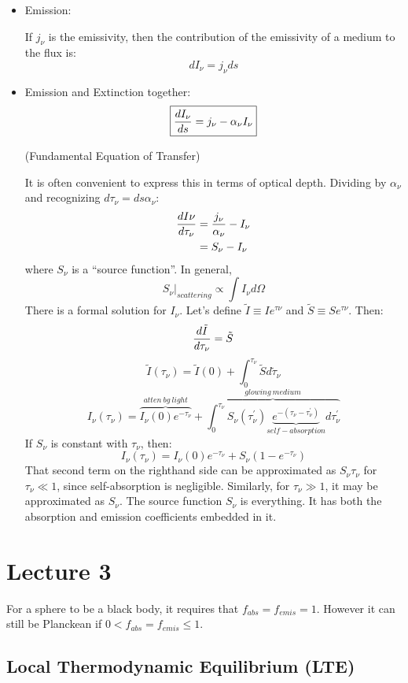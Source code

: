 \documentclass[11pt]{article}
\def\eval#1{\big|_{#1}}
\begin{document}
\begin{itemize}
\item Emission:\par
If $j_\nu $ is the emissivity, then the contribution of the emissivity of
a medium to the flux is:
$$dI_\nu=j_\nu ds$$
\item Emission and Extinction together:
$$\boxed{{dI_\nu\over ds}=j_\nu-\alpha_\nu I_\nu}$$
\centerline{(Fundamental Equation of Transfer)}\par
It is often convenient to express this in terms of optical depth.  
Dividing by $\alpha_\nu$ and recognizing $d\tau_\nu = ds \alpha_\nu$:
$$\begin{aligned}{dI\nu\over d\tau_\nu}&={j_\nu\over\alpha_\nu}-I_\nu\\ 
&=S_\nu-I_\nu\\
\end{aligned}$$
where $S_\nu$ is a ``source function''. In general,
$$S_\nu\eval{scattering}\propto\int{I_\nu d\Omega}$$
There is a formal solution for $I_\nu$.  Let's define 
$\tilde I\equiv Ie^{\tau\nu}$ and $\tilde S\equiv Se^{\tau\nu}$.  Then:
$${d\tilde I\over d\tau_\nu}=\tilde S$$
$$\tilde I(\tau _\nu)=\tilde I(0)+\int_0^{\tau_\nu}{\tilde Sd\tilde\tau_\nu}$$
$$\boxed{I_\nu(\tau_\nu)=\overbrace{I_\nu(0)e^{-\tau_\nu}}^{atten\ bg\ light}
+\overbrace{\int_0^{\tau_\nu}{S_\nu(\tau_\nu^\prime)
\underbrace{e^{-(\tau_\nu-\tau_\nu^\prime)}}_{self-absorption}
d\tau_\nu^\prime}}^{glowing\ medium}}$$
If $S_\nu$ is constant with $\tau_\nu$, then:
$$I_\nu(\tau_\nu)=I_\nu(0)e^{-\tau_\nu}+S_\nu(1-e^{-\tau_\nu})$$
That second term on the righthand side can be approximated as $S_\nu\tau_\nu$
for $\tau_\nu\ll 1$, since self-absorption is negligible.  Similarly, for
$\tau_\nu\gg 1$, it may be approximated as $S_\nu$.
The source function $S_\nu$ is everything.  It has both the absorption and
emission coefficients embedded in it.
\end{itemize}

\def\eboltz{e^{{-h\nu _0 \over kT}}}

\section*{ Lecture 3}

For a sphere to be a black body, it requires that $f_{abs} = f_{emis} = 1$.
However it can still be Planckean if $0<f_{abs}=f_{emis}\le 1$.

\subsection*{ Local Thermodynamic Equilibrium (LTE)}
\end{document}
